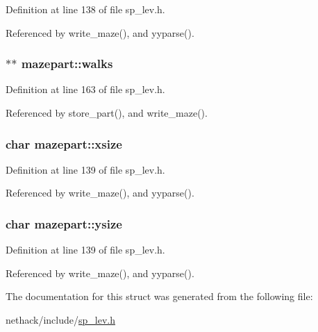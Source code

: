 Definition at line 138 of file sp\+\_\+lev.\+h.



Referenced by write\+\_\+maze(), and yyparse().

\hypertarget{structmazepart_a45a7f4fecef5ff4bd0ad3bfd87aa641c}{
\subsubsection[{walks}]{$\ast$$\ast$ mazepart\+::walks}}\label{structmazepart_a45a7f4fecef5ff4bd0ad3bfd87aa641c}


Definition at line 163 of file sp\+\_\+lev.\+h.



Referenced by store\+\_\+part(), and write\+\_\+maze().

\hypertarget{structmazepart_acedba0086dc6b1f652a04429c4a187c3}{
\subsubsection[{xsize}]{\setlength{\rightskip}{0pt plus 5cm}char mazepart\+::xsize}}\label{structmazepart_acedba0086dc6b1f652a04429c4a187c3}


Definition at line 139 of file sp\+\_\+lev.\+h.



Referenced by write\+\_\+maze(), and yyparse().

\hypertarget{structmazepart_a67ebc967705c17055149acce62d9dfa7}{
\subsubsection[{ysize}]{\setlength{\rightskip}{0pt plus 5cm}char mazepart\+::ysize}}\label{structmazepart_a67ebc967705c17055149acce62d9dfa7}


Definition at line 139 of file sp\+\_\+lev.\+h.



Referenced by write\+\_\+maze(), and yyparse().



The documentation for this struct was generated from the following file\+:\begin{DoxyCompactItemize}
\item 
nethack/include/\hyperlink{sp__lev_8h}{sp\+\_\+lev.\+h}\end{DoxyCompactItemize}
